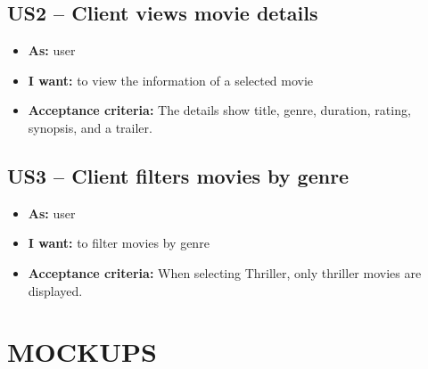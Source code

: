 \documentclass[12pt, letterpaper]{article}
\begin{document}
\subsection*{US2 – Client views movie details}
\begin{itemize}
    \item \textbf{As:} user
    \item \textbf{I want:} to view the information of a selected movie
    \item \textbf{Acceptance criteria:} The details show title, genre, duration, rating, synopsis, and a trailer.
\end{itemize}

\subsection*{US3 – Client filters movies by genre}
\begin{itemize}
    \item \textbf{As:} user
    \item \textbf{I want:} to filter movies by genre
    \item \textbf{Acceptance criteria:} When selecting Thriller, only thriller movies are displayed.
\end{itemize}


\section{MOCKUPS}
\end{document}
